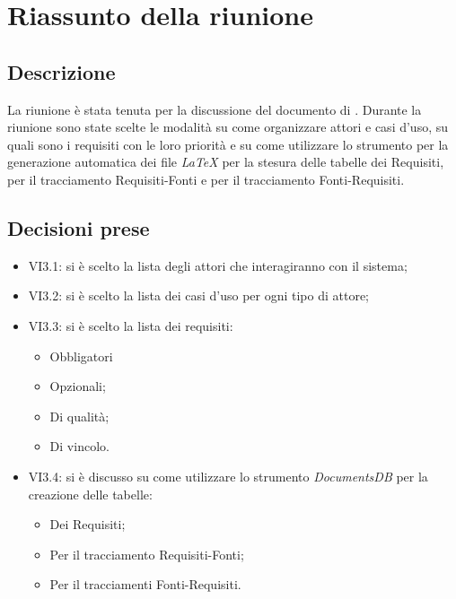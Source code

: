 \section{Riassunto della riunione}
\subsection{Descrizione}

La riunione è stata tenuta per la discussione del documento di \AdR. Durante la riunione sono state scelte le modalità su come organizzare attori e casi d'uso, su quali sono i requisiti con le loro priorità e su come utilizzare lo strumento per la generazione automatica dei file \textit{\LaTeX {}} per la stesura delle tabelle dei Requisiti, per il tracciamento Requisiti-Fonti e per il tracciamento Fonti-Requisiti.

\subsection{Decisioni prese}
\begin{itemize}
\item VI3.1: si è scelto la lista degli attori che interagiranno con il sistema;
\item VI3.2: si è scelto la lista dei casi d'uso per ogni tipo di attore;
\item VI3.3: si è scelto la lista dei requisiti:  
	\begin{itemize}
		\item Obbligatori  
		\item Opzionali;
		\item Di qualità; 
		\item Di vincolo.
	\end{itemize}
\item VI3.4: si è discusso su come utilizzare lo strumento \textit{DocumentsDB} per la creazione delle tabelle:
	\begin{itemize}
		\item Dei Requisiti;
		\item Per il tracciamento Requisiti-Fonti;
		\item Per il tracciamenti Fonti-Requisiti.
	\end{itemize}
\end{itemize}